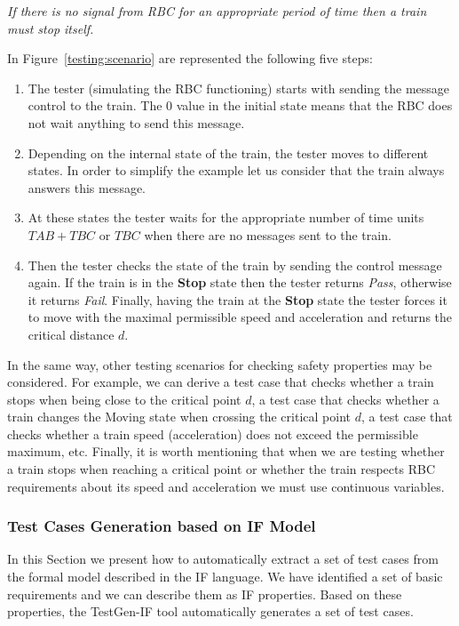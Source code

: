 \documentclass{template/openetcs_article}
\begin{document}


\textit{If there is no signal from RBC for an appropriate period of time then a train must stop itself.}

In Figure~\ref{testing:scenario} are represented the following five steps:

\begin{enumerate}
\item The tester (simulating the RBC functioning) starts with sending the message control to the train. The 0 value in the initial state means that the RBC does not wait anything to send this message.
\item Depending on the internal state of the train, the tester moves to different states. In order to simplify the example let us consider that the train always answers this message.
\item At these states the tester waits for the appropriate number of time units $TAB + TBC$ or $TBC$ when there are no messages sent to the train.
\item Then the tester checks the state of the train by sending the control message again.
 If the train is in the \textbf{Stop} state then the tester returns \textit{Pass}, otherwise it returns \textit{Fail}. Finally, having the train at the \textbf{Stop} state the tester forces it to move with the maximal permissible speed and acceleration and returns the critical distance $d$.
\end{enumerate}
 
In the same way, other testing scenarios for checking safety properties may be considered. For example, we can derive a test case that checks whether a train stops when being close to the critical point $d$, a test case that checks whether a train changes the Moving state when crossing the critical point $d$, a test case that checks whether a train speed (acceleration) does not exceed the permissible maximum, etc. Finally, it is worth mentioning that when we are testing whether a train stops when reaching a critical point or whether the train respects RBC requirements about its speed and acceleration we must use continuous variables.

\subsubsection{Test Cases Generation based on IF Model}

In this Section we present how to automatically extract a set of test cases from the formal model described in the IF language. We have identified a set of basic requirements and we can describe them as IF properties.  Based on these properties, the TestGen-IF tool automatically generates a set of test cases.
\end{document}
